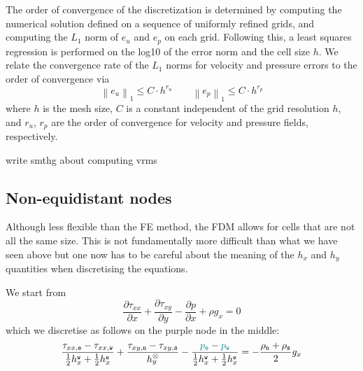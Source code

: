 The order of convergence of the discretization
is determined by computing the numerical solution
defined on a sequence of uniformly refined grids,
and computing the $L_1$ norm of $e_u$ and $e_p$ on each
grid. Following this, a least squares regression is
performed on the log10 of the error norm and the
cell size $h$. We relate the convergence rate of the $L_1$
norms for velocity and pressure errors to the order
of convergence via
\[
\left\| e_u \right\|_1 \leq C \cdot h^{r_u}
\qquad
\left\| e_p \right\|_1 \leq C \cdot h^{r_p}
\]
where $h$ is the mesh size, $C$ is a constant 
independent of the grid resolution $h$, and $r_u$, $r_p$ are the
order of convergence for velocity and pressure
fields, respectively. 

{\color{red} write smthg about computing vrms}





\subsection{Non-equidistant nodes \label{ss:fdm_stokes_hvar}}

Although less flexible than the FE method, the FDM allows for cells 
that are not all the same size.
This is not fundamentally more difficult than what we have seen above but 
one now has to be careful about the meaning of the $h_x$ and $h_y$
quantities when discretising the equations.  






We start from 
\[
\frac{\partial \tau_{xx}}{\partial x}  + 
\frac{\partial \tau_{xy}}{\partial y}  
- \frac{\partial p}{\partial x} + \rho g_x = 0
\]
which we discretise as follows on the purple node in the middle:
\[
\frac{\tau_{xx,{\tt e}}-\tau_{xx,{\tt w}}}{\frac12h_x^{\tt w}+\frac12h_x^{\tt e}} 
+ \frac{\tau_{xy,{\tt n}}-\tau_{xy,{\tt s}}}{h_y^\otimes} 
-\frac{{\color{teal}p_{\tt e}}-{\color{teal}p_{\tt w}}}{\frac12h_x^{\tt w}+\frac12h_x^{\tt e}} 
= -\frac{\rho_{\tt n}+\rho_{\tt s}}{2} g_x
\]

